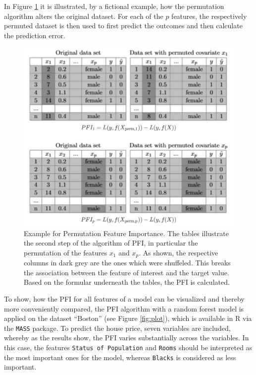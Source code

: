 \documentclass[
]{krantz}
\begin{document}
In Figure \ref{fig:PFI} it is illustrated, by a fictional example, how the permutation algorithm alters the original dataset. For each of the \(p\) features, the respectively permuted dataset is then used to first predict the outcomes and then calculate the prediction error.

\begin{figure}

{\centering \includegraphics[width=0.65\linewidth]{images/Permutation_All} 

}

\caption{Example for Permutation Feature Importance. The tables illustrate the second step of the algorithm of PFI, in particular the permutation of the features $x_{1}$ and $x_{p}$. As shown, the respective columns in dark grey are the ones which were shuffeled. This breaks the association between the feature of interest and the target value. Based on the formular underneath the tables, the PFI is calculated.}\label{fig:PFI}
\end{figure}

To show, how the PFI for all features of a model can be visualized and thereby more conveniently compared, the PFI algorithm with a random forest model is applied on the dataset ``Boston'' (see Figure \ref{fig:plot}), which is available in R via the \texttt{MASS} package. To predict the house price, seven variables are included, whereby as the results show, the PFI varies substantially across the variables. In this case, the features \texttt{Status\ of\ Population} and \texttt{Rooms} should be interpreted as the most important ones for the model, whereas \texttt{Blacks} is considered as less important.
\end{document}
